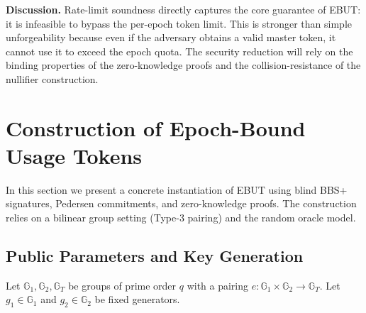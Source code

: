 \documentclass[11pt]{article}
\theoremstyle{definitionstyle}
\theoremstyle{plain}
\begin{document}
\noindent \textbf{Discussion.} Rate-limit soundness directly captures the core guarantee of EBUT: it is infeasible to bypass the per-epoch token limit. This is stronger than simple unforgeability because even if the adversary obtains a valid master token, it cannot use it to exceed the epoch quota. The security reduction will rely on the binding properties of the zero-knowledge proofs and the collision-resistance of the nullifier construction.

\section{Construction of Epoch-Bound Usage Tokens}
\label{sec:construction}

In this section we present a concrete instantiation of EBUT using blind BBS+ signatures, Pedersen commitments, and zero-knowledge proofs. The construction relies on a bilinear group setting (Type-3 pairing) and the random oracle model.

\subsection{Public Parameters and Key Generation}

Let $\mathbb{G}_1, \mathbb{G}_2, \mathbb{G}_T$ be groups of prime order $q$ with a pairing $e: \mathbb{G}_1 \times \mathbb{G}_2 \to \mathbb{G}_T$. Let $g_1 \in \mathbb{G}_1$ and $g_2 \in \mathbb{G}_2$ be fixed generators.
\end{document}
